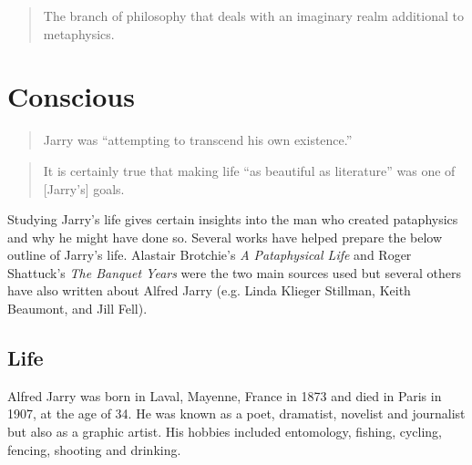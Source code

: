 \begin{quotation}
  The branch of philosophy that deals with an imaginary realm additional to metaphysics. 
\end{quotation}


\section{Conscious}

\begin{quotation}
  Jarry was ``attempting to transcend his own existence.'' 
\end{quotation}

\begin{quotation}
  It is certainly true that making life ``as beautiful as literature'' was one of [Jarry's] goals. 
\end{quotation}

Studying Jarry's life gives certain insights into the man who created pataphysics and why he might have done so. Several works have helped prepare the below outline of Jarry's life. Alastair Brotchie's \textit{A Pataphysical Life} \autocite*{Brotchie2011a} and Roger Shattuck's \textit{The Banquet Years} \autocite*{Shattuck1959} were the two main sources used but several others have also written about Alfred Jarry (e.g. Linda Klieger Stillman, Keith Beaumont, and Jill Fell).


\subsection{Life}

Alfred Jarry was born in Laval, Mayenne, France in 1873 and died in Paris in 1907, at the age of 34. He was known as a poet, dramatist, novelist and journalist but also as a graphic artist. His hobbies included entomology, fishing, cycling, fencing, shooting and drinking.


